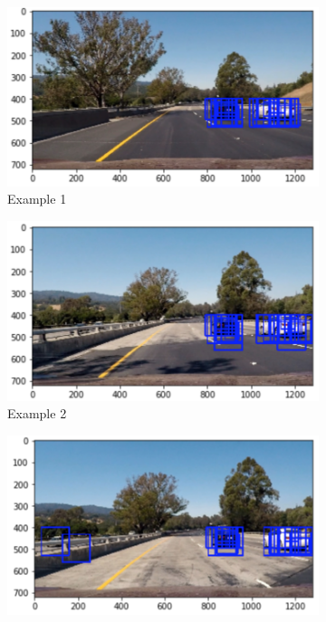\documentclass[12pt]{article}
\begin{document}
\begin{figure}[!h]
\centering
\begin{subfigure}{0.495\textwidth}
\centering
\includegraphics[scale=0.6]{example1.png}
\caption{Example 1}
\end{subfigure}
\begin{subfigure}{0.495\textwidth}
\centering
\includegraphics[scale=0.6]{example2.png}
\caption{Example 2}
\end{subfigure}
\begin{subfigure}{0.495\textwidth}
\centering
\includegraphics[scale=0.6]{example3.png}

\end{subfigure}
\end{figure}
\end{document}
